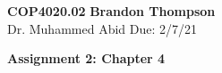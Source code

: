 \noindent
\textbf{COP4020.02} \hfill \textbf{Brandon Thompson} \\
\normalsize Dr. Muhammed Abid \hfill Due: 2/7/21\\

\begin{center}
\textbf{Assignment 2: Chapter 4}
\end{center}